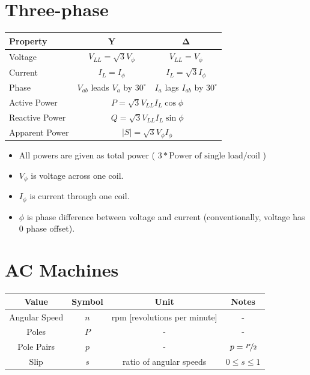 \documentclass[12pt]{article}
\begin{document}
\section{Three-phase}
\begin{center}
		\begin{tabular}{|lcc|}
			\hline
			\bf Property & \bf Y & $ \pmb \Delta $ \\\hline
			Voltage&
			$ V_{LL} = \sqrt{3}V_\phi $ & 
			$ V_{LL} = V_\phi $ \\
			Current&
			$ I_L = I_\phi $ &
			$ I_L = \sqrt{3} I_\phi $ \\
			Phase&
			$ V_{ab} $ leads $ V_a $ by $30 ^\circ $ &
			$ I_{a} $ lags $ I_{ab} $ by $30 ^\circ $ \\
			Active Power &
			\multicolumn{2}{c|}{
				$ P = \sqrt{3}V_{LL}I_L \cos \phi $
			} \\
			Reactive Power &
			\multicolumn{2}{c|}{
				$ Q = \sqrt{3}V_{LL}I_L \sin \phi $
			} \\
			Apparent Power &
			\multicolumn{2}{c|}{
				$ |S| = \sqrt{3}V_\phi I_\phi $
			} \\
			\hline
		\end{tabular}
		\begin{itemize}
			\item All powers are given as total power
				( $ 3 * \text{Power of single load/coil}  $ )
			\item
				$ V_\phi $ is voltage across one coil.
			\item
				$ I_\phi $ is current through one coil.
			\item 
				$ \phi $  is phase difference between voltage and current
			(conventionally, voltage has 0 phase offset).
		\end{itemize}
\end{center}

\section{AC Machines}
\begin{center}
	\begin{tabular}{cccc}
		Value & Symbol & Unit & Notes \\\hline
		Angular Speed & $n $ & rpm [revolutions per minute] & - \\
		Poles & $P$ & - & - \\
		Pole Pairs & $p$ & - & $p = \nicefrac{P}{2} $\\
		Slip & $s$ & ratio of angular speeds & $0 \leq s \leq 1 $ \\
	\end{tabular}
\end{center}
\end{document}
